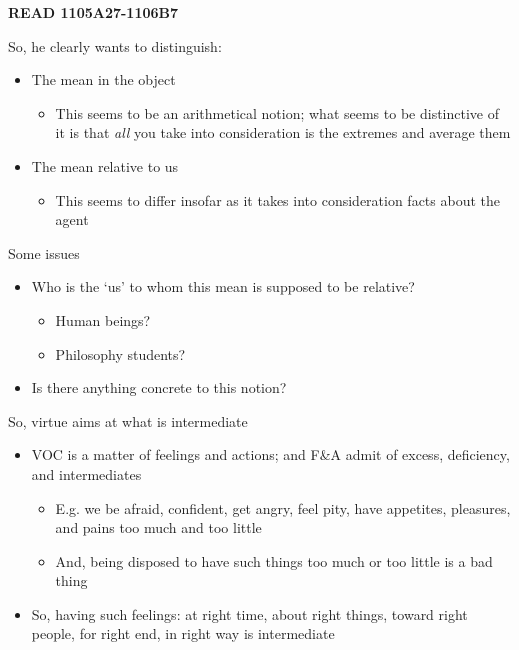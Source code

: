 \documentclass[11pt]{article}
\begin{document}
\noindent\textbf{READ 1105A27-1106B7}
\vspace*{2mm}

\noindent So, he clearly wants to distinguish:

\begin{itemize}\item{The mean in the object}\begin{itemize}\item{This seems to be an arithmetical notion; what seems to be distinctive of it is that \emph{all} you take into consideration is the extremes and average them}\end{itemize}\item{The mean relative to us}\begin{itemize}\item{This seems to differ insofar as it takes into consideration facts about the agent}\end{itemize}\end{itemize}

\noindent Some issues

\begin{itemize}\item{Who is the `us' to whom this mean is supposed to be relative?}\begin{itemize}\item{Human beings?}\item{Philosophy students?}\end{itemize}\item{Is there anything concrete to this notion?}\end{itemize}

\noindent So, virtue aims at what is intermediate

\begin{itemize}\item{VOC is a matter of feelings and actions; and F\&A admit of excess, deficiency, and intermediates}\begin{itemize}\item{E.g. we be afraid, confident, get angry, feel pity, have appetites, pleasures, and pains too much and too little}\item{And, being disposed to have such things too much or too little is a bad thing}\end{itemize}\item{So, having such feelings: at right time, about right things, toward right people, for right end, in right way is intermediate}\end{itemize}
\end{document}
